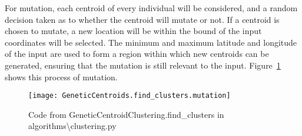 \noindent
For mutation, each centroid of every individual will be considered, and a random decision taken as to whether the
centroid will mutate or not.
If a centroid is chosen to mutate, a new location will be within the bound of the input coordinates will be selected.
The minimum and maximum latitude and longitude of the input are used to form a region within which new centroids can
be generated, ensuring that the mutation is still relevant to the input.
Figure~\ref{fig:GeneticCentroids.find_clusters.mutation} shows this process of mutation.
\begin{figure}[H]
    \centering
    \texttt{[image: GeneticCentroids.find\_clusters.mutation]}
    \caption{Code from GeneticCentroidClustering.find\_clusters in algorithms\textbackslash clustering.py}
    \label{fig:GeneticCentroids.find_clusters.mutation}
\end{figure}

